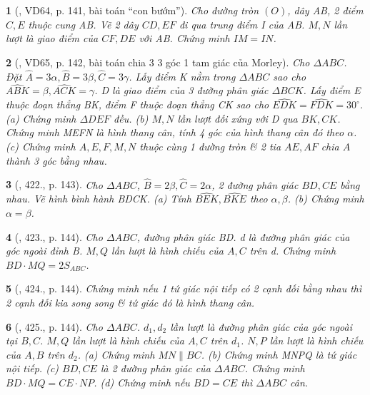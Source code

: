 \documentclass{article}
\newtheorem{baitoan}{}
\begin{document}
\begin{baitoan}[\cite{Binh_Toan_9_tap_2}, VD64, p. 141, bài toán ``con bướm'']
	Cho đường tròn $(O)$, dây AB, 2 điểm $C,E$ thuộc cung AB. Vẽ 2 dây $CD,EF$ đi qua trung điểm I của AB. $M,N$ lần lượt là giao điểm của $CF,DE$ với AB. Chứng minh $IM = IN$.
\end{baitoan}

\begin{baitoan}[\cite{Binh_Toan_9_tap_2}, VD65, p. 142, bài toán chia 3 3 góc 1 tam giác của Morley]
	Cho $\Delta ABC$. Đặt $\widehat{A} = 3\alpha,\widehat{B} = 3\beta,\widehat{C} = 3\gamma$. Lấy điểm K nằm trong $\Delta ABC$ sao cho $\widehat{ABK} = \beta,\widehat{ACK} = \gamma$. D là giao điểm của 3 đường phân giác $\Delta BCK$. Lấy điểm E thuộc đoạn thẳng BK, điểm F thuộc đoạn thẳng CK sao cho $\widehat{EDK} = \widehat{FDK} = 30^\circ$. (a) Chứng minh $\Delta DEF$ đều. (b) $M,N$ lần lượt đối xứng với D qua $BK,CK$. Chứng minh MEFN là hình thang cân, tính 4 góc của hình thang cân đó theo $\alpha$. (c) Chứng minh $A,E,F,M,N$ thuộc cùng 1 đường tròn \& 2 tia $AE,AF$ chia $\widehat{A}$ thành 3 góc bằng nhau.
\end{baitoan}

\begin{baitoan}[\cite{Binh_Toan_9_tap_2}, 422., p. 143]
	Cho $\Delta ABC$, $\widehat{B} = 2\beta,\widehat{C} = 2\alpha$, 2 đường phân giác $BD,CE$ bằng nhau. Vẽ hình bình hành BDCK. (a) Tính $\widehat{BEK},\widehat{BKE}$ theo $\alpha,\beta$. (b) Chứng minh $\alpha = \beta$.
\end{baitoan}

\begin{baitoan}[\cite{Binh_Toan_9_tap_2}, 423., p. 144]
	Cho $\Delta ABC$, đường phân giác BD. d là đường phân giác của góc ngoài đỉnh B. $M,Q$ lần lượt là hình chiếu của $A,C$ trên d. Chứng minh $BD\cdot MQ = 2S_{ABC}$.
\end{baitoan}

\begin{baitoan}[\cite{Binh_Toan_9_tap_2}, 424., p. 144]
	Chứng minh nếu 1 tứ giác nội tiếp có 2 cạnh đối bằng nhau thì 2 cạnh đối kia song song \& tứ giác đó là hình thang cân.
\end{baitoan}

\begin{baitoan}[\cite{Binh_Toan_9_tap_2}, 425., p. 144]
	Cho $\Delta ABC$. $d_1,d_2$ lần lượt là đường phân giác của góc ngoài tại $B,C$. $M,Q$ lần lượt là hình chiếu của $A,C$ trên $d_1$. $N,P$ lần lượt là hình chiếu của $A,B$ trên $d_2$. (a) Chứng minh $MN\parallel BC$. (b) Chứng minh MNPQ là tứ giác nội tiếp. (c) $BD,CE$ là 2 đường phân giác của $\Delta ABC$. Chứng minh $BD\cdot MQ = CE\cdot NP$. (d) Chứng minh nếu $BD = CE$ thì $\Delta ABC$ cân.
\end{baitoan}
\end{document}
